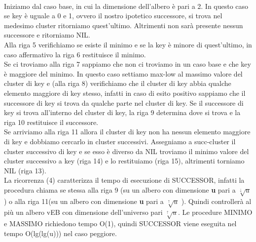 \documentclass{article}
\begin{document}
\begin{flushleft}

            ~\\Iniziamo dal caso base, in cui la dimensione dell'albero è pari a 2.
            In questo caso se key è uguale a 0 e 1, ovvero il nostro ipotetico successore, si trova nel medesimo cluster ritorniamo quest'ultimo. Altrimenti non sarà presente nessun successore e ritorniamo NIL.\\
            Alla riga 5 verifichiamo se esiste il minimo e se la key è minore di quest'ultimo, in caso affermativo la riga 6 restituisce il minimo.\\
            Se ci troviamo alla riga 7 sappiamo che non ci troviamo in un caso base e che key è maggiore del minimo. In questo caso settiamo max-low al massimo valore del cluster di key e (alla riga 8) verifichiamo che il cluster di key abbia qualche elemento maggiore di key stesso, infatti in caso di esito positivo sappiamo che il successore di key si trova da qualche parte nel cluster di key. Se il successore di key si trova all'interno del cluster di key, la riga 9 determina dove si trova e la riga 10 restituisce il successore.\\
            Se arriviamo alla riga 11 allora il cluster di key non ha nessun elemento maggiore di key e dobbiamo cercarlo in cluster successivi. Assegniamo a succ-cluster il cluster successivo di key e se esso è diverso da NIL troviamo il minimo valore del cluster successivo a key (riga 14) e lo restituiamo (riga 15), altrimenti torniamo NIL (riga 13).\\
            La ricorrenza (4) caratterizza il tempo di esecuzione di SUCCESSOR, infatti la procedura chiama se stessa alla riga 9 (su un albero con dimensione \textbf{u} pari a $\sqrt[\downarrow]{u}$ ) o alla riga 11(su un albero con dimensione \textbf{u} pari a $\sqrt[\uparrow]{u}$ ). Quindi controllerà al più un albero vEB con dimensione dell'universo pari $\sqrt[\uparrow]{u}$. Le procedure MINIMO e MASSIMO richiedono tempo O(1), quindi SUCCESSOR viene eseguita nel tempo O(lg(lg(u))) nel caso peggiore.\\     
            
\end{flushleft}        
\end{document}
